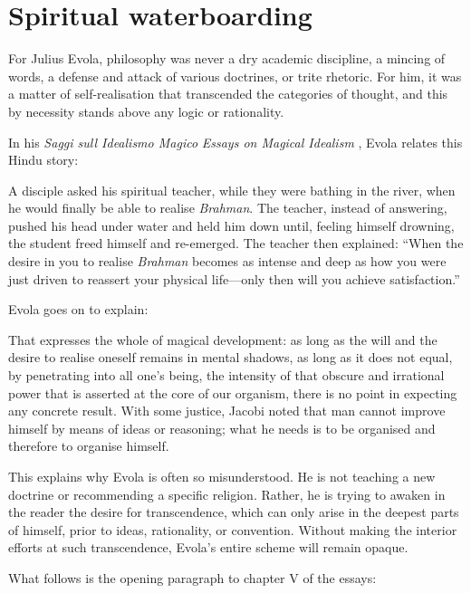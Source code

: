\section{Spiritual waterboarding}

For Julius Evola, philosophy was never a dry academic discipline, a mincing of words, a defense and attack of various doctrines, or trite rhetoric. For him, it was a matter of self-realisation that transcended the categories of thought, and this by necessity stands above any logic or rationality.

In his \emph{Saggi sull Idealismo Magico} \emph{Essays on Magical Idealism} , Evola relates this Hindu story:

\begin{quotex}
A disciple asked his spiritual teacher, while they were bathing in the river, when he would finally be able to realise \emph{Brahman}. The teacher, instead of answering, pushed his head under water and held him down until, feeling himself drowning, the student freed himself and re-emerged. The teacher then explained: ``When the desire in you to realise \emph{Brahman} becomes as intense and deep as how you were just driven to reassert your physical life---only then will you achieve satisfaction.''
\end{quotex}


Evola goes on to explain:

\begin{quotex}
That expresses the whole of magical development: as long as the will and the desire to realise oneself remains in mental shadows, as long as it does not equal, by penetrating into all one's being, the intensity of that obscure and irrational power that is asserted at the core of our organism, there is no point in expecting any concrete result. With some justice, Jacobi noted that man cannot improve himself by means of ideas or reasoning; what he needs is to be organised and therefore to organise himself.
\end{quotex}


This explains why Evola is often so misunderstood. He is not teaching a new doctrine or recommending a specific religion. Rather, he is trying to awaken in the reader the desire for transcendence, which can only arise in the deepest parts of himself, prior to ideas, rationality, or convention. Without making the interior efforts at such transcendence, Evola's entire scheme will remain opaque.

What follows is the opening paragraph to chapter V of the essays:

